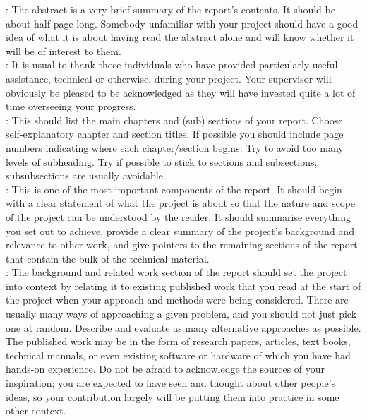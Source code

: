 \newpage
{}: The abstract is a very brief summary of the report's contents. It should be about half page long. Somebody unfamiliar with your project should have a good idea of what it is about having read the abstract alone and will know whether it will be of interest to them.\\

: It is usual to thank those individuals who have provided particularly useful assistance, technical or otherwise, during your project. Your supervisor will obviously be pleased to be acknowledged as they will have invested quite a lot of time overseeing your progress.\\

: This should list the main chapters and (sub) sections of your report. Choose self-explanatory chapter and section titles. If possible you should include page numbers indicating where each chapter/section begins. Try to avoid too many levels of subheading. Try if possible to stick to sections and subsections; subsubsections are usually avoidable.\\

: This is one of the most important components of the report. It should begin with a clear statement of what the project is about so that the nature and scope of the project can be understood by the reader. It should summarise everything you set out to achieve, provide a clear summary of the project's background and relevance to other work, and give pointers to the remaining sections of the report that contain the bulk of the technical material.\\

: The background and related work section of the report should set the project into context by relating it to existing published work that you read at the start of the project when your approach and methods were being considered. There are usually many ways of approaching a given problem, and you should not just pick one at random. Describe and evaluate as many alternative approaches as possible. The published work may be in the form of research papers, articles, text books, technical manuals, or even existing software or hardware of which you have had hands-on experience. Do not be afraid to acknowledge the sources of your inspiration; you are expected to have seen and thought about other people's ideas, so your contribution largely will be putting them into practice in some other context.\\

